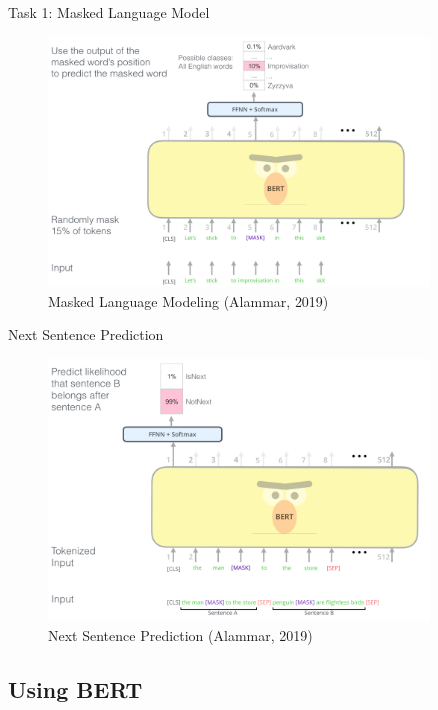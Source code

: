\documentclass[10pt]{beamer}
\begin{document}
\begin{frame}{Task 1: Masked Language Model}

\begin{figure}[h]
\centering
\includegraphics[width=0.9\textwidth]{fig/BERT-language-modeling-masked-lm.png}
\caption{Masked Language Modeling (Alammar, 2019)}
\end{figure}

\end{frame}


\begin{frame}{Next Sentence Prediction}

\begin{figure}[h]
\centering
\includegraphics[width=0.9\textwidth]{fig/bert-next-sentence-prediction.png}
\caption{Next Sentence Prediction (Alammar, 2019)}
\end{figure}

\end{frame}



\subsection{Using BERT}
\end{document}
